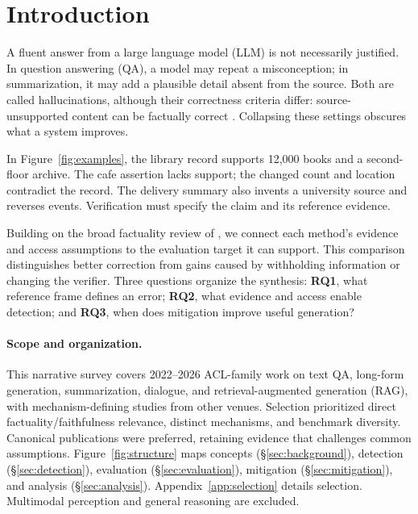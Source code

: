 \section{Introduction}
A fluent answer from a large language model (LLM) is not necessarily justified. In question answering (QA), a model may repeat a misconception; in summarization, it may add a plausible detail absent from the source. Both are called hallucinations, although their correctness criteria differ: source-unsupported content can be factually correct \citep{lin-etal-2022-truthfulqa,cao-etal-2022-hallucinated}. Collapsing these settings obscures what a system improves.


In Figure~\ref{fig:examples}, the library record supports 12,000 books and a second-floor archive. The cafe assertion lacks support; the changed count and location contradict the record. The delivery summary also invents a university source and reverses events. Verification must specify the claim and its reference evidence.

Building on the broad factuality review of \citet{wang-etal-2024-factuality}, we connect each method's evidence and access assumptions to the evaluation target it can support. This comparison distinguishes better correction from gains caused by withholding information or changing the verifier. Three questions organize the synthesis: \textbf{RQ1}, what reference frame defines an error; \textbf{RQ2}, what evidence and access enable detection; and \textbf{RQ3}, when does mitigation improve useful generation?

\paragraph{Scope and organization.}
This narrative survey covers 2022--2026 ACL-family work on text QA, long-form generation, summarization, dialogue, and retrieval-augmented generation (RAG), with mechanism-defining studies from other venues. Selection prioritized direct factuality/faithfulness relevance, distinct mechanisms, and benchmark diversity. Canonical publications were preferred, retaining evidence that challenges common assumptions. Figure~\ref{fig:structure} maps concepts (\S\ref{sec:background}), detection (\S\ref{sec:detection}), evaluation (\S\ref{sec:evaluation}), mitigation (\S\ref{sec:mitigation}), and analysis (\S\ref{sec:analysis}). Appendix~\ref{app:selection} details selection. Multimodal perception and general reasoning are excluded.
